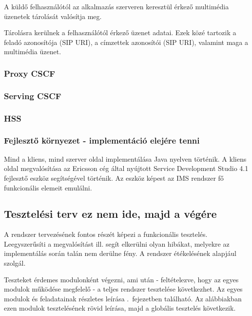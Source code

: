A küldő felhasználótól az alkalmazás szerveren keresztül érkező
multimédia üzenetek tárolását valósítja meg.

Tárolásra kerülnek a felhasználótól érkező üzenet adatai. Ezek közé tartozik
a feladó azonosítója (SIP URI), a címzettek azonosítói (SIP URI), valamint maga a multimédia üzenet.

\subsubsection{Proxy CSCF}
\label{sec:p_cscf}

\subsubsection{Serving CSCF}
\label{sec:s_cscf}

\subsubsection{HSS}
\label{sec:hss}

\subsubsection{Fejlesztő környezet - implementáció elejére tenni}

Mind a kliens, mind szerver oldal implementálása Java nyelven történik. A kliens oldal megvalósítása az Ericsson cég által nyújtott Service Development Studio 4.1 fej\-lesz\-tő eszköz segítségével történik. Az eszköz képest az IMS rendszer fő funkcionális elemeit emulálni.


\subsection{Tesztelési terv ez nem ide, majd a végére}
\label{sec:tesztelesi_terv}

A rendszer tervezésének fontos részét képezi a funkcionális tesztelés. Leegyszerűsíti a megvalósítást ill. segít elkerülni olyan hibákat, melyekre az imp\-le\-men\-tá\-lás során talán nem derülne fény. A rendszer étékelésének alapjául szolgál.

Teszteket érdemes modulonként végezni, ami után - feltételezve, hogy az egyes mo\-du\-lok működése megfelelő - a teljes rendszer tesztelése következhet. %
Az egyes modulok és feladatainak részletes leírása .~fejezetben található. Az alábbiakban ezen modulok tesztelésének rövid leírása, majd a globális tesztelés következik.

